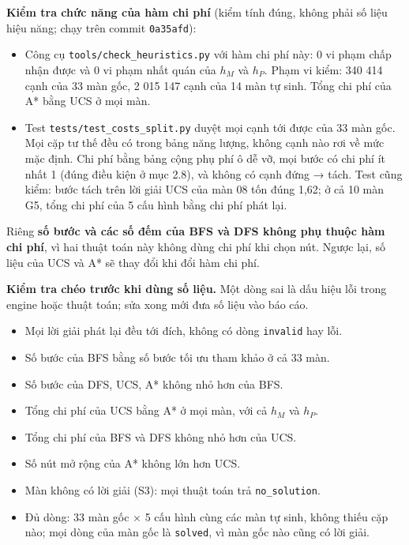 \textbf{Kiểm tra chức năng của hàm chi phí} (kiểm tính đúng, không phải số liệu hiệu năng; chạy trên commit \texttt{0a35afd}):

\begin{itemize}
\tightlist
\item
  Công cụ \texttt{tools/\allowbreak{}check\_\allowbreak{}heuristics.\allowbreak{}py} với hàm chi phí này: 0 vi phạm chấp nhận được và 0 vi phạm nhất quán của \(h_M\) và \(h_P\). Phạm vi kiểm: 340 414 cạnh của 33 màn gốc, 2 015 147 cạnh của 14 màn tự sinh. Tổng chi phí của A* bằng UCS ở mọi màn.
\item
  Test \texttt{tests/\allowbreak{}test\_\allowbreak{}costs\_\allowbreak{}split.\allowbreak{}py} duyệt mọi cạnh tới được của 33 màn gốc. Mọi cặp tư thế đều có trong bảng năng lượng, không cạnh nào rơi về mức mặc định. Chi phí bằng bảng cộng phụ phí ô dễ vỡ, mọi bước có chi phí ít nhất 1 (đúng điều kiện ở mục 2.8), và không có cạnh đứng → tách. Test cũng kiểm: bước tách trên lời giải UCS của màn 08 tốn đúng 1,62; ở cả 10 màn G5, tổng chi phí của 5 cấu hình bằng chi phí phát lại.
\end{itemize}

Riêng \textbf{số bước và các số đếm của BFS và DFS không phụ thuộc hàm chi phí}, vì hai thuật toán này không dùng chi phí khi chọn nút. Ngược lại, số liệu của UCS và A* sẽ thay đổi khi đổi hàm chi phí.

\textbf{Kiểm tra chéo trước khi dùng số liệu.} Một dòng sai là dấu hiệu lỗi trong engine hoặc thuật toán; sửa xong mới đưa số liệu vào báo cáo.

\begin{itemize}
\tightlist
\item
  Mọi lời giải phát lại đều tới đích, không có dòng \texttt{invalid} hay lỗi.
\item
  Số bước của BFS bằng số bước tối ưu tham khảo ở cả 33 màn.
\item
  Số bước của DFS, UCS, A* không nhỏ hơn của BFS.
\item
  Tổng chi phí của UCS bằng A* ở mọi màn, với cả \(h_M\) và \(h_P\).
\item
  Tổng chi phí của BFS và DFS không nhỏ hơn của UCS.
\item
  Số nút mở rộng của A* không lớn hơn UCS.
\item
  Màn không có lời giải (S3): mọi thuật toán trả \texttt{no\_\allowbreak{}solution}.
\item
  Đủ dòng: 33 màn gốc × 5 cấu hình cùng các màn tự sinh, không thiếu cặp nào; mọi dòng của màn gốc là \texttt{solved}, vì màn gốc nào cũng có lời giải.
\end{itemize}

